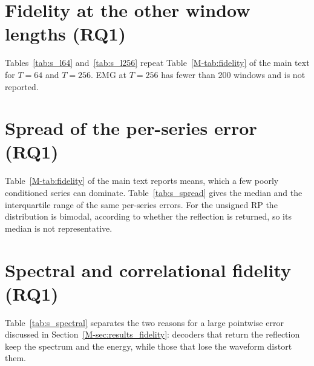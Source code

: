 \documentclass[preprint,12pt]{elsarticle}
\begin{document}
\section{Fidelity at the other window lengths (RQ1)}\label{sec:s_lengths}
Tables~\ref{tab:s_l64} and~\ref{tab:s_l256} repeat Table~\ref{M-tab:fidelity} of the main text for $T=64$ and $T=256$. EMG at $T=256$ has fewer than 200 windows and is not reported.

\begin{table}[H]
\centering
\caption{Mean 8-bit NMAE of every encoding--decoder combination at $T=64$. Uns./Sig.: unsigned and signed RP.}\label{tab:s_l64}
\scriptsize
\setlength{\tabcolsep}{2.5pt}

\end{table}

\begin{table}[H]
\centering
\caption{As Table~\ref{tab:s_l64}, at $T=256$.}\label{tab:s_l256}
\scriptsize
\setlength{\tabcolsep}{2.5pt}

\end{table}

\section{Spread of the per-series error (RQ1)}\label{sec:s_spread}
Table~\ref{M-tab:fidelity} of the main text reports means, which a few poorly conditioned series can dominate. Table~\ref{tab:s_spread} gives the median and the interquartile range of the same per-series errors. For the unsigned RP the distribution is bimodal, according to whether the reflection is returned, so its median is not representative.

\begin{table}[H]
\centering
\caption{Median [interquartile range] of the per-series 8-bit NMAE at $T=128$, on the series of Table~\ref{M-tab:fidelity}.}\label{tab:s_spread}
\scriptsize
\setlength{\tabcolsep}{2.5pt}
\resizebox{\textwidth}{!}{}
\end{table}

\section{Spectral and correlational fidelity (RQ1)}\label{sec:s_spectral}
Table~\ref{tab:s_spectral} separates the two reasons for a large pointwise error discussed in Section~\ref{M-sec:results_fidelity}: decoders that return the reflection keep the spectrum and the energy, while those that lose the waveform distort them.
\end{document}
